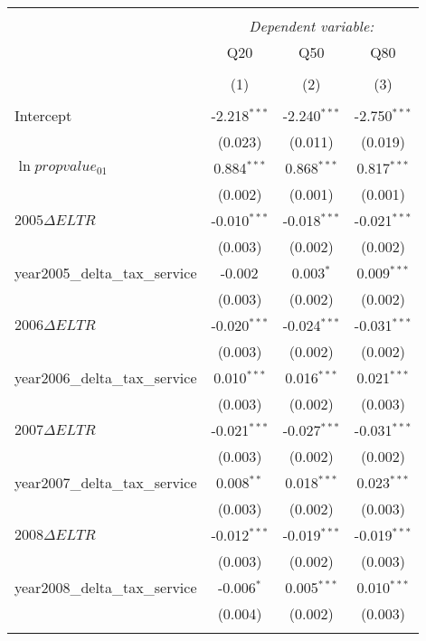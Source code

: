 \begin{table}[!htbp] \centering
\begin{tabular}{@{\extracolsep{5pt}}lccc}
\\[-1.8ex]\hline
\hline \\[-1.8ex]
& \multicolumn{3}{c}{\textit{Dependent variable:}} \
\cr \cline{3-4}
\\[-1.8ex] & \multicolumn{1}{c}{Q20} & \multicolumn{1}{c}{Q50} & \multicolumn{1}{c}{Q80}  \\
\\[-1.8ex] & (1) & (2) & (3) \\
\hline \\[-1.8ex]
 Intercept & -2.218$^{***}$ & -2.240$^{***}$ & -2.750$^{***}$ \\
  & (0.023) & (0.011) & (0.019) \\
 $\ln{propvalue_{01}}$ & 0.884$^{***}$ & 0.868$^{***}$ & 0.817$^{***}$ \\
  & (0.002) & (0.001) & (0.001) \\
 $2005\Delta ELTR$ & -0.010$^{***}$ & -0.018$^{***}$ & -0.021$^{***}$ \\
  & (0.003) & (0.002) & (0.002) \\
 year2005_delta_tax_service & -0.002$^{}$ & 0.003$^{*}$ & 0.009$^{***}$ \\
  & (0.003) & (0.002) & (0.002) \\
 $2006\Delta ELTR$ & -0.020$^{***}$ & -0.024$^{***}$ & -0.031$^{***}$ \\
  & (0.003) & (0.002) & (0.002) \\
 year2006_delta_tax_service & 0.010$^{***}$ & 0.016$^{***}$ & 0.021$^{***}$ \\
  & (0.003) & (0.002) & (0.003) \\
 $2007\Delta ELTR$ & -0.021$^{***}$ & -0.027$^{***}$ & -0.031$^{***}$ \\
  & (0.003) & (0.002) & (0.002) \\
 year2007_delta_tax_service & 0.008$^{**}$ & 0.018$^{***}$ & 0.023$^{***}$ \\
  & (0.003) & (0.002) & (0.003) \\
 $2008\Delta ELTR$ & -0.012$^{***}$ & -0.019$^{***}$ & -0.019$^{***}$ \\
  & (0.003) & (0.002) & (0.003) \\
 year2008_delta_tax_service & -0.006$^{*}$ & 0.005$^{***}$ & 0.010$^{***}$ \\
  & (0.004) & (0.002) & (0.003) \\
\hline \\[-1.8ex]

\end{tabular}
\end{table}
